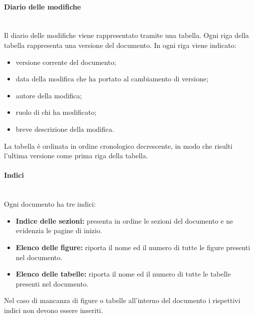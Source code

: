 \paragraph{Diario delle modifiche}\mbox{}\\
Il diario delle modifiche viene rappresentato tramite una tabella. Ogni riga della tabella rappresenta una versione del documento. In ogni riga viene indicato: 
\begin{itemize}
	\item versione corrente del documento; 
	\item data della modifica che ha portato al cambiamento di versione; 
	\item autore della modifica;
	\item ruolo di chi ha modificato; 
	\item breve descrizione della modifica. 
\end{itemize}
La tabella è ordinata in ordine cronologico decrescente, in modo che risulti l'ultima versione come prima riga della tabella.

\paragraph{Indici}\mbox{}\\
Ogni documento ha tre indici: 
\begin{itemize}
	\item \textbf{Indice delle sezioni:} presenta in ordine le sezioni del documento e ne evidenzia le pagine di inizio.
	\item \textbf{Elenco delle figure:} riporta il nome ed il numero di tutte le figure presenti nel documento.
	\item \textbf{Elenco delle tabelle:} riporta il nome ed il numero di tutte le tabelle presenti nel documento.
\end{itemize}
Nel caso di mancanza di figure o tabelle all'interno del documento i rispettivi indici non devono essere inseriti.

